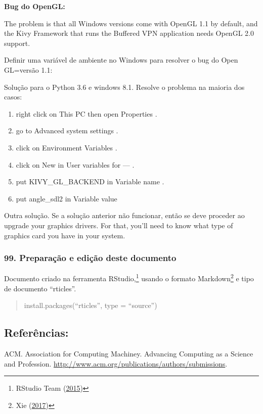 \documentclass[12pt,]{article}
\providecommand{\tightlist}{%
  \setlength{\itemsep}{0pt}\setlength{\parskip}{0pt}}
\let\rmarkdownfootnote\footnote%
\def\footnote{\protect\rmarkdownfootnote}
\begin{document}
\textbf{Bug do OpenGL:}

The problem is that all Windows versions come with OpenGL 1.1 by
default, and the Kivy Framework that runs the Buffered VPN application
needs OpenGL 2.0 support.

Definir uma variável de ambiente no Windows para resolver o bug do Open
GL=versão 1.1:

Solução para o Python 3.6 e windows 8.1. Resolve o problema na maioria
dos casos:

\begin{enumerate}
\def\labelenumi{\arabic{enumi}.}
\tightlist
\item
  right click on This PC then open Properties .
\item
  go to Advanced system settings .
\item
  click on Environment Variables .
\item
  click on New in User variables for --- .
\item
  put KIVY\_GL\_BACKEND in Variable name .
\item
  put angle\_sdl2 in Variable value
\end{enumerate}

Outra solução. Se a solução anterior não funcionar, então se deve
proceder ao upgrade your graphics drivers. For that, you'll need to know
what type of graphics card you have in your system.

\subsubsection{99. Preparação e edição deste
documento}\label{preparacao-e-edicao-deste-documento}

Documento criado na ferramenta RStudio,\footnote{RStudio Team
  (\protect\hyperlink{ref-rstudio}{2015})} usando o formato
Markdown\footnote{Xie
  (\protect\hyperlink{ref-R-bookdown}{2017})\cite{R-bookdown}} e tipo de
documento ``rticles''.

\begin{quote}
install.packages(``rticles'', type = ``source'')
\end{quote}

\subsection*{Referências:}\label{referencias}

ACM. Association for Computing Machiney. Advancing Computing as a
Science and Profession.
\url{http://www.acm.org/publications/authors/submissions}.
\end{document}
